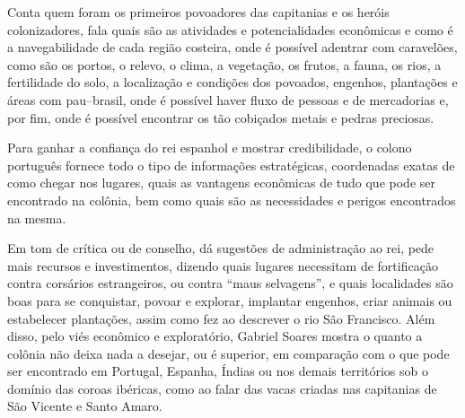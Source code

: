 \documentclass[12pt]{extarticle}
\begin{document}
{Conta quem foram os primeiros povoadores das capitanias e os heróis colonizadores, fala quais são as atividades e potencialidades econômicas e como é a navegabilidade de cada região costeira, onde é possível adentrar com caravelões, como são os portos, o relevo, o clima, a vegetação, os frutos, a fauna, os rios, a fertilidade do solo, a localização e condições dos povoados, engenhos, plantações e áreas com pau--brasil, onde é possível haver fluxo de pessoas e de mercadorias e, por fim, onde é possível encontrar os tão cobiçados metais e pedras preciosas.

Para ganhar a confiança do rei espanhol e mostrar credibilidade, o colono português fornece todo o tipo de informações estratégicas, coordenadas exatas de como chegar nos lugares, quais as vantagens econômicas de tudo que pode ser encontrado na colônia, bem como quais são as necessidades e perigos encontrados na mesma.

Em tom de crítica ou de conselho, dá sugestões de administração ao rei, pede mais recursos e investimentos, dizendo quais lugares necessitam de fortificação contra corsários estrangeiros, ou contra ``maus selvagens'', e quais localidades são boas para se conquistar, povoar e explorar, implantar engenhos, criar animais ou estabelecer plantações, assim como fez ao descrever o rio São Francisco.
Além disso, pelo viés econômico e exploratório, Gabriel Soares mostra o quanto a colônia não deixa nada a desejar, ou é superior, em comparação com o que pode ser encontrado em Portugal, Espanha, Índias ou nos demais territórios sob o domínio das coroas ibéricas, como ao falar das vacas criadas nas capitanias de São Vicente e Santo Amaro. 




}
\end{document}
